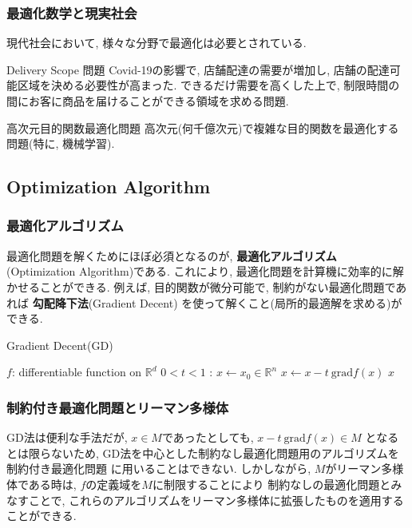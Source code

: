 \documentclass[dvipdfmx,11pt]{beamer}		%
\newcommand{\R}{\mathbb{R}}
\begin{document}
    \begin{frame}
        \frametitle{最適化数学と現実社会}
        現代社会において, 様々な分野で最適化は必要とされている.
        \begin{exampleblock}{Delivery Scope 問題}
            Covid-19の影響で, 店舗配達の需要が増加し, 店舗の配達可能区域を決める必要性が高まった.
            できるだけ需要を高くした上で, 制限時間の間にお客に商品を届けることができる領域を求める問題.
        \end{exampleblock}
        \begin{exampleblock}{高次元目的関数最適化問題}
            高次元(何千億次元)で複雑な目的関数を最適化する問題(特に, 機械学習). 
        \end{exampleblock} 
    \end{frame}
    \subsection{Optimization Algorithm}
    \begin{frame}
        \frametitle{最適化アルゴリズム}
        最適化問題を解くためにほぼ必須となるのが, \textbf{最適化アルゴリズム} (Optimization Algorithm)である.
        これにより, 最適化問題を計算機に効率的に解かせることができる. 例えば, 目的関数が微分可能で, 制約がない最適化問題であれば
        \textbf{勾配降下法}(Gradient Decent) を使って解くこと(局所的最適解を求める)ができる.
        \begin{algorithm}[H]
            \caption{Gradient Decent(GD)}
            \begin{algorithmic}
                \REQUIRE $f$: differentiable function on $\R^{d}$
                \REQUIRE $0< t <1$ : 
                \STATE $x\leftarrow x_{0}\in\R^n$
                \STATE $x\leftarrow x - t~\mathrm{grad} f(x)$ 
                \ENDWHILE
                \RETURN $x$
            \end{algorithmic}
        \end{algorithm}
    \end{frame}
    \begin{frame}
        \frametitle{制約付き最適化問題とリーマン多様体}
        GD法は便利な手法だが, $x\in M$であったとしても, $x - t~\mathrm{grad} f(x)\in M$
        となるとは限らないため, GD法を中心とした制約なし最適化問題用のアルゴリズムを制約付き最適化問題
        に用いることはできない. しかしながら, $M$がリーマン多様体である時は, $f$の定義域を$M$に制限することにより
        制約なしの最適化問題とみなすことで, これらのアルゴリズムをリーマン多様体に拡張したものを適用することができる. 
    \end{frame}
\end{document}
